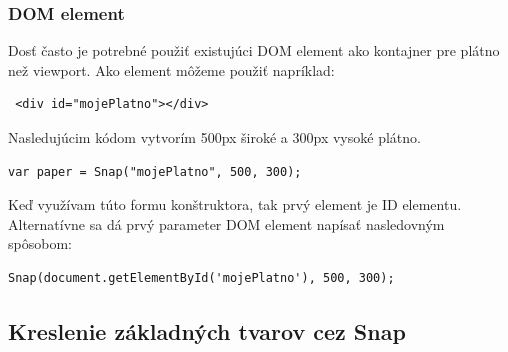 \subsubsection{DOM element}

Dosť často je potrebné použiť existujúci DOM element ako kontajner pre plátno než viewport. Ako element môžeme použiť napríklad:
\begin{lstlisting}
 <div id="mojePlatno"></div>  
 \end{lstlisting}

Nasledujúcim kódom vytvorím 500px široké a 300px vysoké plátno.

\begin{lstlisting}
var paper = Snap("mojePlatno", 500, 300);
\end{lstlisting}

Keď využívam túto formu konštruktora, tak prvý element je ID elementu. Alternatívne sa dá prvý parameter DOM element napísať nasledovným spôsobom: 
\begin{lstlisting}
Snap(document.getElementById('mojePlatno'), 500, 300);
\end{lstlisting}


\newpage

\subsection{Kreslenie základných tvarov cez Snap}


